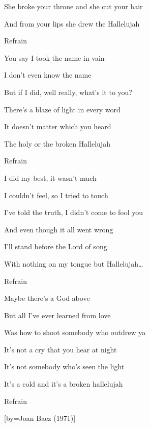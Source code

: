 \beginverse
She broke your throne and she cut your hair
\endverse

\beginverse
And from your lips she drew the Hallelujah
\endverse

\beginverse
Refrain
\endverse

\beginverse
You say I took the name in vain
\endverse

\beginverse
I don’t even know the name
\endverse

\beginverse
But if I did, well really, what’s it to you?
\endverse

\beginverse
There’s a blaze of light in every word
\endverse

\beginverse
It doesn’t matter which you heard
\endverse

\beginverse
The holy or the broken Hallelujah
\endverse

\beginverse
Refrain
\endverse

\beginverse
I did my best, it wasn’t much
\endverse

\beginverse
I couldn’t feel, so I tried to touch
\endverse

\beginverse
I’ve told the truth, I didn’t come to fool you
\endverse

\beginverse
And even though it all went wrong
\endverse

\beginverse
I’ll stand before the Lord of song
\endverse

\beginverse
With nothing on my tongue but Hallelujah…
\endverse

\beginverse
Refrain
\endverse

\beginverse
Maybe there's a God above
\endverse

\beginverse
But all I've ever learned from love
\endverse

\beginverse
Was how to shoot somebody who outdrew ya
\endverse

\beginverse
It's not a cry that you hear at night
\endverse

\beginverse
It's not somebody who's seen the light
\endverse

\beginverse
It's a cold and it's a broken hallelujah
\endverse

\beginverse
Refrain
\endverse

[by={Joan Baez (1971)}]


